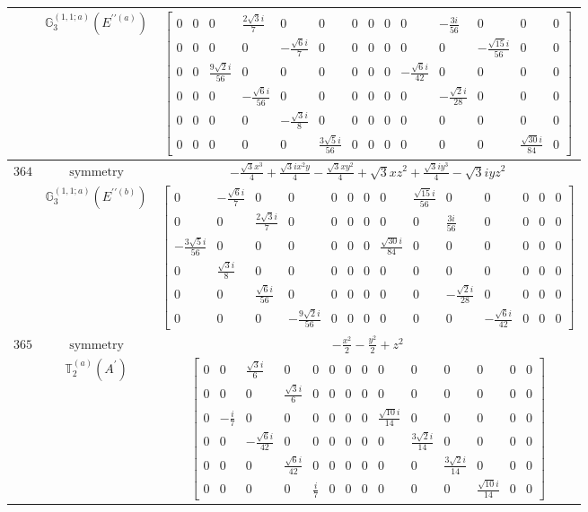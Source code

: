 \documentclass[fleqn,8pt,landscape]{jsarticle}
\begin{document}
\begin{longtable}{ccc}
$  $ & $ \mathbb{G}_{3}^{(1,1;a)}(E^{\prime\prime(a)}) $ & $ \begin{bmatrix} 0 & 0 & 0 & \frac{2 \sqrt{3} i}{7} & 0 & 0 & 0 & 0 & 0 & 0 & - \frac{3 i}{56} & 0 & 0 & 0 \\ 0 & 0 & 0 & 0 & - \frac{\sqrt{6} i}{7} & 0 & 0 & 0 & 0 & 0 & 0 & - \frac{\sqrt{15} i}{56} & 0 & 0 \\ 0 & 0 & \frac{9 \sqrt{2} i}{56} & 0 & 0 & 0 & 0 & 0 & 0 & - \frac{\sqrt{6} i}{42} & 0 & 0 & 0 & 0 \\ 0 & 0 & 0 & - \frac{\sqrt{6} i}{56} & 0 & 0 & 0 & 0 & 0 & 0 & - \frac{\sqrt{2} i}{28} & 0 & 0 & 0 \\ 0 & 0 & 0 & 0 & - \frac{\sqrt{3} i}{8} & 0 & 0 & 0 & 0 & 0 & 0 & 0 & 0 & 0 \\ 0 & 0 & 0 & 0 & 0 & \frac{3 \sqrt{5} i}{56} & 0 & 0 & 0 & 0 & 0 & 0 & \frac{\sqrt{30} i}{84} & 0 \end{bmatrix} $ \\ \hline
$ 364 $ & $ \text{symmetry} $ & $ - \frac{\sqrt{3} x^{3}}{4} + \frac{\sqrt{3} i x^{2} y}{4} - \frac{\sqrt{3} x y^{2}}{4} + \sqrt{3} x z^{2} + \frac{\sqrt{3} i y^{3}}{4} - \sqrt{3} i y z^{2} $ \\
$  $ & $ \mathbb{G}_{3}^{(1,1;a)}(E^{\prime\prime(b)}) $ & $ \begin{bmatrix} 0 & - \frac{\sqrt{6} i}{7} & 0 & 0 & 0 & 0 & 0 & 0 & \frac{\sqrt{15} i}{56} & 0 & 0 & 0 & 0 & 0 \\ 0 & 0 & \frac{2 \sqrt{3} i}{7} & 0 & 0 & 0 & 0 & 0 & 0 & \frac{3 i}{56} & 0 & 0 & 0 & 0 \\ - \frac{3 \sqrt{5} i}{56} & 0 & 0 & 0 & 0 & 0 & 0 & \frac{\sqrt{30} i}{84} & 0 & 0 & 0 & 0 & 0 & 0 \\ 0 & \frac{\sqrt{3} i}{8} & 0 & 0 & 0 & 0 & 0 & 0 & 0 & 0 & 0 & 0 & 0 & 0 \\ 0 & 0 & \frac{\sqrt{6} i}{56} & 0 & 0 & 0 & 0 & 0 & 0 & - \frac{\sqrt{2} i}{28} & 0 & 0 & 0 & 0 \\ 0 & 0 & 0 & - \frac{9 \sqrt{2} i}{56} & 0 & 0 & 0 & 0 & 0 & 0 & - \frac{\sqrt{6} i}{42} & 0 & 0 & 0 \end{bmatrix} $ \\ \hline
$ 365 $ & $ \text{symmetry} $ & $ - \frac{x^{2}}{2} - \frac{y^{2}}{2} + z^{2} $ \\
$  $ & $ \mathbb{T}_{2}^{(a)}(A^{\prime}) $ & $ \begin{bmatrix} 0 & 0 & \frac{\sqrt{3} i}{6} & 0 & 0 & 0 & 0 & 0 & 0 & 0 & 0 & 0 & 0 & 0 \\ 0 & 0 & 0 & \frac{\sqrt{3} i}{6} & 0 & 0 & 0 & 0 & 0 & 0 & 0 & 0 & 0 & 0 \\ 0 & - \frac{i}{7} & 0 & 0 & 0 & 0 & 0 & 0 & \frac{\sqrt{10} i}{14} & 0 & 0 & 0 & 0 & 0 \\ 0 & 0 & - \frac{\sqrt{6} i}{42} & 0 & 0 & 0 & 0 & 0 & 0 & \frac{3 \sqrt{2} i}{14} & 0 & 0 & 0 & 0 \\ 0 & 0 & 0 & \frac{\sqrt{6} i}{42} & 0 & 0 & 0 & 0 & 0 & 0 & \frac{3 \sqrt{2} i}{14} & 0 & 0 & 0 \\ 0 & 0 & 0 & 0 & \frac{i}{7} & 0 & 0 & 0 & 0 & 0 & 0 & \frac{\sqrt{10} i}{14} & 0 & 0 \end{bmatrix} $ \\ \hline

\end{longtable}
\end{document}
